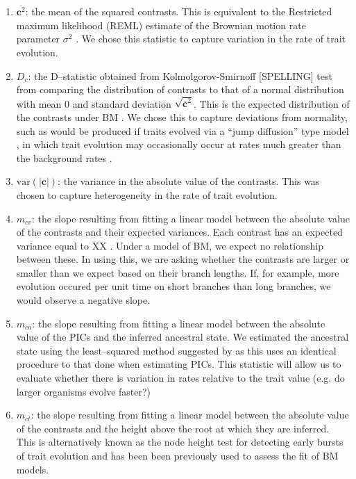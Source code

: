 \documentclass[12pt]{article}
\begin{document}
\begin{enumerate}
\item $\overline{\mathbf{c}^2}$: the mean of the squared contrasts. This is equivalent to the Restricted maximum likelihood (REML) estimate of the Brownian motion rate parameter $\sigma^2$ \citep{Garland1992, Rohlf2001}. We chose this statistic to capture variation in the rate of trait evolution.

\item $D_c$: the D--statistic obtained from Kolmolgorov-Smirnoff [SPELLING] test \citep{ks} from comparing the distribution of contrasts to that of a normal distribution with mean 0 and standard deviation $\sqrt{\overline{\mathbf{c}}^2}$. This is the expected distribution of the contrasts under BM \citep{Felsenstein1985, Rohlf2001}. We chose this to capture deviations from normality, such as would be produced if traits evolved via a ``jump diffusion'' type model \citep{Landis2013, Eastmanjump}, in which trait evolution may occasionally occur at rates much greater than the background rates \citep[see][]{PennellPE}.

\item $\mathrm{var} (| \mathbf{c} |)$: the variance in the absolute value of the contrasts. This was chosen to capture heterogeneity in the rate of trait evolution.

\item $m_{cv}$: the slope resulting from fitting a linear model between the absolute value of the contrasts and their expected variances. Each contrast has an expected variance equal to XX \citep{Felsenstein1985}. Under a model of BM, we expect no relationship between these. In using this, we are asking whether the contrasts are larger or smaller than we expect based on their branch lengths. If, for example, more evolution occured per unit time on short branches than long branches, we would observe a negative slope. 

\item $m_{ca}$: the slope resulting from fitting a linear model between the absolute value of the PICs and the inferred ancestral state. We estimated the ancestral state using the least--squared method suggested by \citep{Felsenstein1985} as this uses an identical procedure to that done when estimating PICs. This statistic will allow us to evaluate whether there is variation in rates relative to the trait value (e.g. do larger organisms evolve faster?)

\item $m_{ct}$: the slope resulting from fitting a linear model between the absolute value of the contrasts and the height above the root at which they are inferred. This is alternatively known as the node height test \citep{FreckletonHarvey2006, SlaterPennell} for detecting early bursts of trait evolution and has been been previously used to assess the fit of BM models. 
\end{enumerate}
\end{document}
